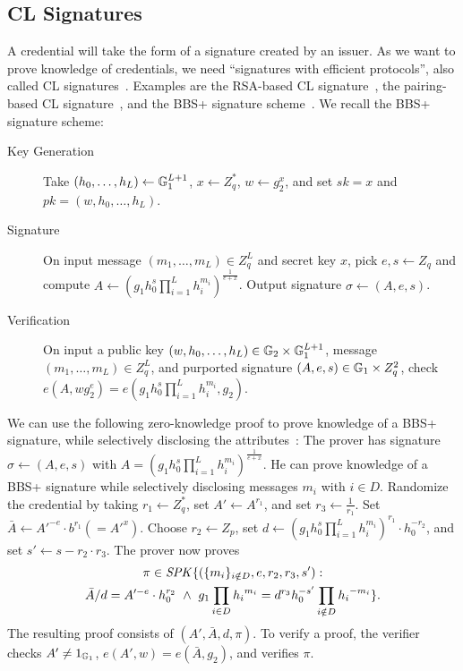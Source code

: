 \subsection{CL Signatures}
A credential will take the form of a signature created by an issuer. 
As we want to prove knowledge of credentials, we need ``signatures with efficient protocols'', also called CL signatures~\cite{camlys02b}. 
Examples are the RSA-based CL signature~\cite{camlys02b}, the pairing-based CL signature~\cite{camlys04},
and the BBS+ signature scheme~\cite{bobosh04,ASMC13}. 
We recall the BBS+ signature scheme:
\begin{description}
\item[Key Generation] Take $(h_0, \ldots, h_L) \gets \mathbb{G}_1^{L+1}$, $x \gets Z_q^*$, $w \gets g_2^x$, and set $sk = x$ and $pk = (w, h_0, \ldots, h_L)$.
\item[Signature] On input message $(m_1, \ldots, m_L) \in Z_q^L$ and secret key $x$, 
pick $e, s \gets Z_q$ and compute $A \gets (g_1 h_0^s \prod_{i = 1}^{L} h_i^{m_{i}})^{\frac{1}{e+x}}$.
Output signature $\sigma \gets (A, e, s)$.
\item[Verification] On input a public key $(w, h_0, \ldots, h_L) \in \mathbb{G}_2 \times \mathbb{G}_1^{L+1}$, 
message $(m_1, \ldots, m_L) \in Z_q^L$, and purported signature $(A, e, s) \in \mathbb{G}_1 \times Z_q^2$, 
check $e(A, w g_2^e) = e(g_1 h_0^s \prod_{i = 1}^{L} h_i^{m_{i}}, g_2)$.
\end{description}

We can use the following zero-knowledge proof to prove knowledge of a BBS+ signature, while selectively disclosing the attributes~\cite{CDL16eprint}:
The prover has signature $\sigma \gets (A, e, s)$ with $A = (g_1 h_0^s \prod_{i = 1}^{L} h_i^{m_{i}})^{\frac{1}{e+x}}$.
He can prove knowledge of a BBS+ signature while selectively disclosing messages $m_i$ with $i \in D$.
Randomize the credential by taking $r_1 \gets Z_q^*$, set $A' \gets A^{r_1}$, and set $r_3 \gets \frac{1}{r_1}$.
Set $\bar{A} \gets A'^{-e} \cdot b^{r_1} (= A'^{x})$.
Choose $r_2 \gets Z_p$, set $d \gets (g_1 h_0^s \prod_{i = 1}^{L} h_i^{m_{i}})^{r_1} \cdot h_0^{-r_2}$, and set $s' \gets s - r_2 \cdot r_3$.
The prover now proves 
\begin{multline*}
\pi \in \mathit{SPK}\{(\{m_i\}_{i \notin D}, e, r_2, r_3, s') : \\
\bar{A}/d = A'^{-e} \cdot h_0^{r_2} ~\land~ g_1 \prod_{i \in D} {h_{i}}^{m_i}= d^{r_3}h_0^{-s'} \prod_{i \notin D} {h_{i}}^{-m_i}\}.
\end{multline*}
The resulting proof consists of $(A', \bar{A}, d, \pi)$.
To verify a proof, the verifier checks $A' \neq 1_{\mathbb{G}_1}$, $e(A', w) = e(\bar{A}, g_2)$, and verifies $\pi$.

